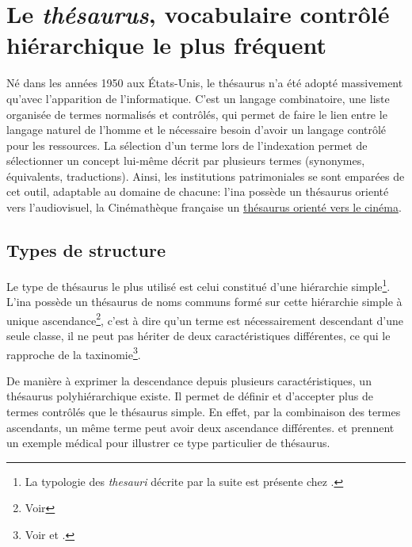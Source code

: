 \section{\label{I-C-2}Le \textit{thésaurus}, vocabulaire contrôlé hiérarchique le plus fréquent}

Né dans les années 1950 aux États-Unis, le thésaurus n'a été adopté massivement qu'avec l'apparition de l'informatique. C'est un langage combinatoire, une liste organisée de termes normalisés et contrôlés, qui permet de faire le lien entre le langage naturel de l'homme et le nécessaire besoin d'avoir un langage contrôlé pour les ressources. La sélection d'un terme lors de l'indexation permet de sélectionner un concept lui-même décrit par plusieurs termes (synonymes, équivalents, traductions). Ainsi, les institutions patrimoniales se sont emparées de cet outil, adaptable au domaine de chacune: l'\ac{ina} possède un thésaurus orienté vers l'audiovisuel, la Cinémathèque française un \href{http://www.cineressources.net/thesaurus/}{thésaurus orienté vers le cinéma}.

\subsection{\label{I-C-2-a}Types de structure}

Le type de thésaurus le plus utilisé est celui constitué d'une hiérarchie simple\footnote{La typologie des \textit{thesauri} décrite par la suite est présente chez \cite{rosenfeld_information_2015}.}. L'\ac{ina} possède un thésaurus de noms communs formé sur cette hiérarchie simple à unique ascendance\footnote{Voir }, c'est à dire qu'un terme est nécessairement descendant d'une seule classe, il ne peut pas hériter de deux caractéristiques différentes, ce qui le rapproche de la taxinomie\footnote{Voir  et .}.

 

De manière à exprimer la descendance depuis plusieurs caractéristiques, un thésaurus polyhiérarchique existe. Il permet de définir et d'accepter plus de termes contrôlés que le thésaurus simple. En effet, par la combinaison des termes ascendants, un même terme peut avoir deux ascendance différentes.  et  prennent un exemple médical pour illustrer ce type particulier de thésaurus.

